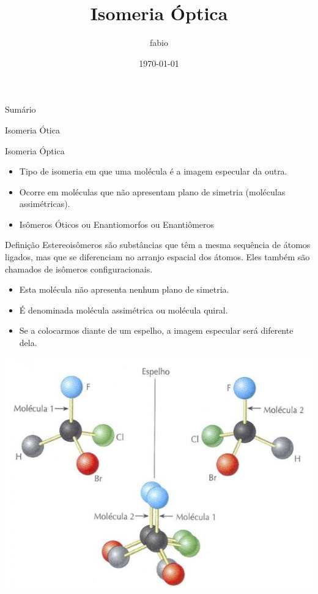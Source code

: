 \documentclass{beamer}
\author{fabio}
\date{\today}
\title{Isomeria Óptica}
\begin{document}
\begingroup
  \maketitle
  \endgroup
\begin{frame}{Sumário}
\tableofcontents
\end{frame}



\begin{frame}[label={sec:org50c07fd}]{Isomeria Ótica}
\begin{block}{Isomeria Óptica}
\begin{itemize}
\item Tipo de isomeria em que uma molécula é a imagem especular da outra.
\item Ocorre em moléculas que não apresentam plano de simetria (moléculas assimétricas).
\item \alert{Isômeros Óticos} ou \alert{Enantiomorfos} ou \alert{Enantiômeros}
\end{itemize}

\begin{bclogo}[couleur=blue!30 , arrondi=0.1 , logo=\bcplume , epBarre=3.5]{Definição}
\alert{Estereoisômeros} são substâncias que têm a mesma sequência de átomos ligados, mas que se diferenciam no arranjo espacial dos átomos. Eles também são chamados de isômeros configuracionais.
\end{bclogo}
\end{block}


\begin{block}{}
\begin{itemize}
\item Esta molécula não apresenta nenhum plano de simetria.
\item É denominada molécula assimétrica ou molécula \alert{quiral}.
\item Se a colocarmos diante de um espelho, a imagem especular será diferente dela.
\end{itemize}

\begin{center}
\includegraphics[scale=.5]{./Isomeria_Espelho.jpg}
\end{center}
\end{block}
\end{frame}
\end{document}
